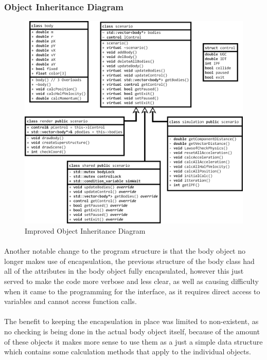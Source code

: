 {\subsubsection{Object Inheritance Diagram}
\begin{figure}[!ht]
  \centering
  \includegraphics[width=\textwidth]{img/didredo.png}
  \caption{Improved Object Inheritance Diagram}
\end{figure}

\paragraph{}
Another notable change to the program structure is that the body object no longer makes use of encapsulation, the previous structure of the body class had all of the attributes in the body object fully encapsulated, however this just served to make the code more verbose and less clear, as well as causing difficulty when it came to the programming for the interface, as it requires direct access to variables and cannot access function calls.

\paragraph{}
The benefit to keeping the encapsulation in place was limited to non-existent, as no checking is being done in the actual body object itself, because of the amount of these objects it makes more sense to use them as a just a simple data structure which contains some calculation methods that apply to the individual objects.

}
